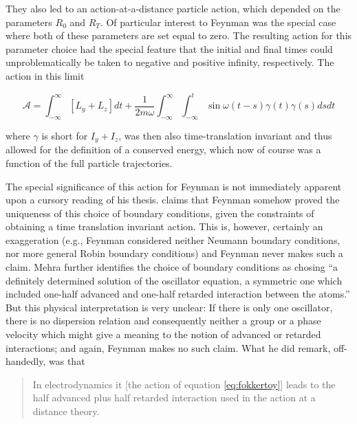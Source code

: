 \documentclass[12pt,a4paper]{article}
\begin{document}
They also led to an action-at-a-distance particle action, which depended on the parameters $R_0$ and $R_T$. Of particular interest to Feynman was the special case where both of these parameters are set equal to zero. The resulting action for this parameter choice had the special feature that the initial and final times could unproblematically be taken to negative and positive infinity, respectively. The action in this limit 

\begin{equation}
\label{eq:fokkertoy}
\mathcal{A} = \int_{-\infty}^{\infty} \left[ L_y + L_z \right] dt + \frac{1}{2 m \omega} \int_{-\infty}^{\infty} \int_{-\infty}^{t} \sin{\omega (t-s)} \gamma(t) \gamma (s) ds dt
\end{equation}

where $\gamma$ is short for $I_y + I_z$, was then also  time-translation invariant and thus allowed for the definition of a conserved energy, which now of course was a function of the full particle trajectories. 

The special significance of this action for Feynman is not immediately apparent upon a cursory reading of his thesis. \citep[p. 133]{mehra_1994_the-beat} claims that Feynman somehow proved the uniqueness of this choice of boundary conditions, given the constraints of obtaining a time translation invariant action. This is, however, certainly an exaggeration (e.g., Feynman considered neither Neumann boundary conditions, nor more general Robin boundary conditions) and Feynman never makes such a claim. Mehra further identifies the choice of boundary conditions as chosing ``a definitely determined solution of the oscillator equation, a symmetric one which included one-half advanced and one-half retarded interaction between the atoms.'' But this physical interpretation is very unclear: If there is only one oscillator, there is no dispersion relation and consequently neither a group or a phase velocity which might give a meaning to the notion of advanced or retarded interactions; and again, Feynman makes no such claim. What he did remark, off-handedly, was that

\begin{quote}
In electrodynamics it [the action of equation \ref{eq:fokkertoy}] leads to the half advanced plus half retarded interaction used in the action at a distance theory.
\end{quote}
\end{document}
